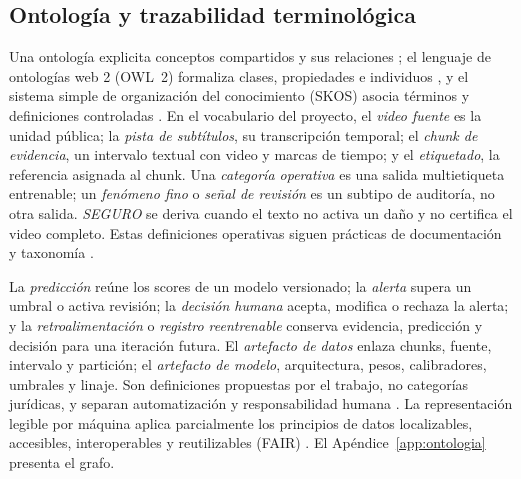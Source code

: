 \subsection{Ontología y trazabilidad terminológica}

Una ontología explicita conceptos compartidos y sus relaciones \cite{gruber1993ontology}; el lenguaje de ontologías web 2 (OWL~2) formaliza clases, propiedades e individuos \cite{w3c2012owl2}, y el sistema simple de organización del conocimiento (SKOS) asocia términos y definiciones controladas \cite{w3c2009skos}. En el vocabulario del proyecto, el \emph{video fuente} es la unidad pública; la \emph{pista de subtítulos}, su transcripción temporal; el \emph{chunk de evidencia}, un intervalo textual con video y marcas de tiempo; y el \emph{etiquetado}, la referencia asignada al chunk. Una \emph{categoría operativa} es una salida multietiqueta entrenable; un \emph{fenómeno fino} o \emph{señal de revisión} es un subtipo de auditoría, no otra salida. \emph{SEGURO} se deriva cuando el texto no activa un daño y no certifica el video completo. Estas definiciones operativas siguen prácticas de documentación y taxonomía \cite{bender2018datastatements,pushkarna2022datacards,banko2020taxonomy}.

La \emph{predicción} reúne los scores de un modelo versionado; la \emph{alerta} supera un umbral o activa revisión; la \emph{decisión humana} acepta, modifica o rechaza la alerta; y la \emph{retroalimentación} o \emph{registro reentrenable} conserva evidencia, predicción y decisión para una iteración futura. El \emph{artefacto de datos} enlaza chunks, fuente, intervalo y partición; el \emph{artefacto de modelo}, arquitectura, pesos, calibradores, umbrales y linaje. Son definiciones propuestas por el trabajo, no categorías jurídicas, y separan automatización y responsabilidad humana \cite{gorwa2020moderation,mozannar2020defer}. La representación legible por máquina aplica parcialmente los principios de datos localizables, accesibles, interoperables y reutilizables (FAIR) \cite{wilkinson2016fair}. El Apéndice~\ref{app:ontologia} presenta el grafo.
